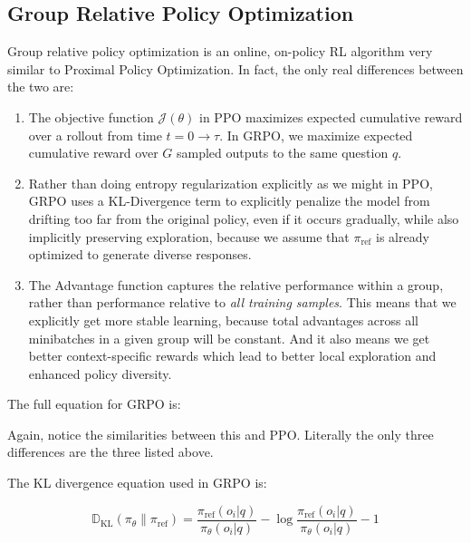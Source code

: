 \documentclass[12pt]{article}
\begin{document}
\subsection{Group Relative Policy Optimization}
Group relative policy optimization is an online, on-policy RL algorithm very similar to Proximal Policy Optimization. In fact, the only real differences between the two are:

\begin{enumerate}
\item The objective function \(\mathcal{J}(\theta)\) in PPO maximizes expected cumulative reward over a rollout from time \(t=0 \rightarrow \tau\). In GRPO, we maximize expected cumulative reward over \(G\) sampled outputs to the same question \(q\). 
\item Rather than doing entropy regularization explicitly as we might in PPO, GRPO uses a KL-Divergence term to explicitly penalize the model from drifting too far from the original policy, even if it occurs gradually, while also implicitly preserving exploration, because we assume that \(\pi_\text{ref}\) is already optimized to generate diverse responses. 
\item The Advantage function captures the relative performance within a group, rather than performance relative to \emph{all training samples}. This means that we explicitly get more stable learning, because total advantages across all minibatches in a given group will be constant. And it also means we get better context-specific rewards which lead to better local exploration and enhanced policy diversity.
\end{enumerate}

The full equation for GRPO is:

\noindent
{}

Again, notice the similarities between this and PPO. Literally the only three differences are the three listed above. 

The KL divergence equation used in GRPO is:

\[
\mathbb{D}_{\text{KL}}(\pi_{\theta} \| \pi_{\text{ref}}) = 
\frac{\pi_{\text{ref}}(o_i | q)}{\pi_{\theta}(o_i | q)} - \log \frac{\pi_{\text{ref}}(o_i | q)}{\pi_{\theta}(o_i | q)} - 1
\]
\end{document}
